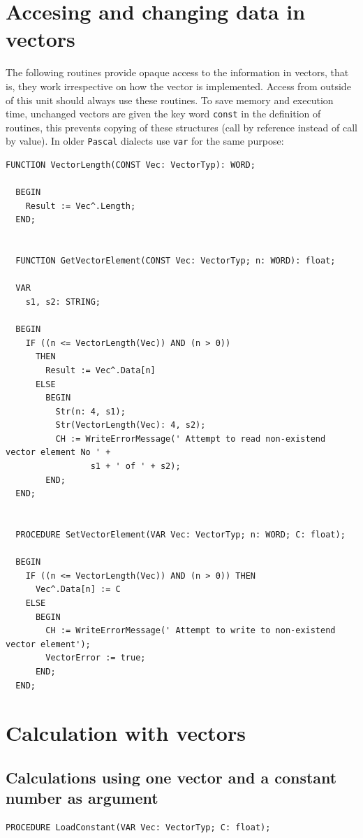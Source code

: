 \begin{refsection}
\section{Accesing and changing data in vectors}

The following routines provide opaque access to the information in vectors, that is, they work irrespective on how the vector is implemented. Access from outside of this unit should always use these routines. To save memory and execution time, unchanged vectors are given the key word \texttt{const} in the definition of routines, this prevents copying of these structures (call by reference instead of call by value). In older \texttt{Pascal} dialects use \texttt{var} for the same purpose:
\begin{lstlisting}[caption=Accesing and changing data in vectors]
  FUNCTION VectorLength(CONST Vec: VectorTyp): WORD;

  BEGIN
    Result := Vec^.Length;
  END;


  FUNCTION GetVectorElement(CONST Vec: VectorTyp; n: WORD): float;

  VAR
    s1, s2: STRING;

  BEGIN
    IF ((n <= VectorLength(Vec)) AND (n > 0))
      THEN
        Result := Vec^.Data[n]
      ELSE
        BEGIN
          Str(n: 4, s1);
          Str(VectorLength(Vec): 4, s2);
          CH := WriteErrorMessage(' Attempt to read non-existend vector element No ' +
                 s1 + ' of ' + s2);
        END;
  END;


  PROCEDURE SetVectorElement(VAR Vec: VectorTyp; n: WORD; C: float);

  BEGIN
    IF ((n <= VectorLength(Vec)) AND (n > 0)) THEN
      Vec^.Data[n] := C
    ELSE
      BEGIN
        CH := WriteErrorMessage(' Attempt to write to non-existend vector element');
        VectorError := true;
      END;
  END;
\end{lstlisting}

\section{Calculation with vectors}

\subsection{Calculations using one vector and a constant number as argument}

\begin{lstlisting}[caption=Calculations using one vector and a constant number as argument]
  PROCEDURE LoadConstant(VAR Vec: VectorTyp; C: float);


\end{lstlisting}
\end{refsection}
